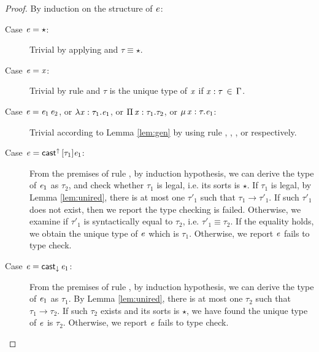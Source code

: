 \begin{proof}
	By induction on the structure of $\mathit{e}$:
	\begin{description}
	    \item[Case $\mathit{e}  =  \star$:] Trivial by applying  and $\tau  \equiv  \star$.
		\item[Case $\mathit{e}  =  \mathit{x}$:] Trivial by rule  and $\tau$ is the unique type of $\mathit{x}$ if $\mathit{x}  :  \tau \, \in \, \Gamma$.
		\item[Case $\mathit{e}=\mathit{e_{{\mathrm{1}}}} \, \mathit{e_{{\mathrm{2}}}}$, or $\lambda  \mathit{x}  :  \tau_{{\mathrm{1}}}  .  \mathit{e_{{\mathrm{1}}}}$, or $\Pi \, \mathit{x}  :  \tau_{{\mathrm{1}}}  .  \tau_{{\mathrm{2}}}$, or $\mu \, \mathit{x}  :  \tau  .  \mathit{e_{{\mathrm{1}}}}$:] Trivial according to Lemma \ref{lem:gen} by using rule , , , or  respectively.
		\item[Case $\mathit{e}=\mathsf{cast}^{\uparrow} \, [  \tau_{{\mathrm{1}}}  ]  \mathit{e_{{\mathrm{1}}}}$:] From the premises of rule , by induction hypothesis, we can derive the type of $\mathit{e_{{\mathrm{1}}}}$ as $\tau_{{\mathrm{2}}}$, and check whether $\tau_{{\mathrm{1}}}$ is legal, i.e. its sorts is $\star$. If $\tau_{{\mathrm{1}}}$ is legal, by Lemma \ref{lem:unired}, there is at most one $\tau'_{{\mathrm{1}}}$ such that $\tau_{{\mathrm{1}}}  \longrightarrow  \tau'_{{\mathrm{1}}}$. If such $\tau'_{{\mathrm{1}}}$ does not exist, then we report the type checking is failed. Otherwise, we examine if $\tau'_{{\mathrm{1}}}$ is syntactically equal to $\tau_{{\mathrm{2}}}$, i.e. $\tau'_{{\mathrm{1}}}  \equiv  \tau_{{\mathrm{2}}}$. If the equality holds, we obtain the unique type of $\mathit{e}$ which is $\tau_{{\mathrm{1}}}$. Otherwise, we report $\mathit{e}$ fails to type check.
		\item[Case $\mathit{e}=\mathsf{cast}_{\downarrow} \, \mathit{e_{{\mathrm{1}}}}$:] From the premises of rule , by induction hypothesis, we can derive the type of $\mathit{e_{{\mathrm{1}}}}$ as $\tau_{{\mathrm{1}}}$. By Lemma \ref{lem:unired}, there is at most one $\tau_{{\mathrm{2}}}$ such that $\tau_{{\mathrm{1}}}  \longrightarrow  \tau_{{\mathrm{2}}}$. If such $\tau_{{\mathrm{2}}}$ exists and its sorts is $\star$, we have found the unique type of $\mathit{e}$ is $\tau_{{\mathrm{2}}}$. Otherwise, we report $\mathit{e}$ fails to type check.
	\end{description}
\end{proof}

